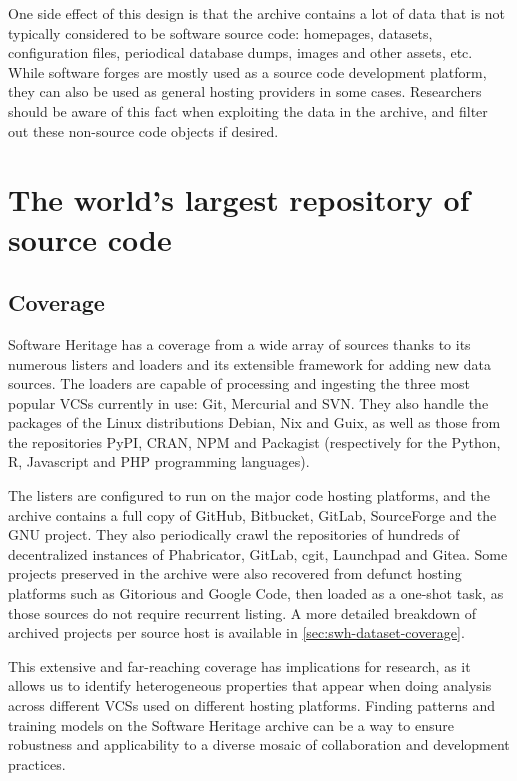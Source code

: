 One side effect of this design is that the archive contains a lot of data that
is not typically considered to be software source code: homepages, datasets,
configuration files, periodical database dumps, images and other assets, etc.
While software forges are mostly used as a source code development platform,
they can also be used as general hosting providers in some cases. Researchers
should be aware of this fact when exploiting the data in the archive, and
filter out these non-source code objects if desired.

\section{The world's largest repository of source code}

\subsection{Coverage}

Software Heritage has a coverage from a wide array of sources thanks to its
numerous listers and loaders and its extensible framework for adding new data
sources. The loaders are capable of processing and ingesting the three most
popular \glspl{VCS} currently in use: Git, Mercurial and SVN\@. They also
handle the packages of the Linux distributions Debian, Nix and Guix, as well as
those from the repositories PyPI, CRAN, NPM and Packagist (respectively for the
Python, R, Javascript and PHP programming languages).

The listers are configured to run on the major code hosting platforms, and the
archive contains a full copy of GitHub, Bitbucket, GitLab, SourceForge and the
GNU project. They also periodically crawl the repositories of hundreds of
decentralized instances of Phabricator, GitLab, cgit, Launchpad and Gitea.
Some projects preserved in the archive were also recovered from defunct
hosting platforms such as Gitorious and Google Code, then loaded as a one-shot
task, as those sources do not require recurrent listing. A more detailed
breakdown of archived projects per source host is available in
\cref{sec:swh-dataset-coverage}.

This extensive and far-reaching coverage has implications for research, as it
allows us to identify heterogeneous properties that appear when doing analysis
across different \glspl{VCS} used on different hosting platforms. Finding
patterns and training models on the Software Heritage archive can be a way to
ensure robustness and applicability to a diverse mosaic of collaboration and
development practices.

